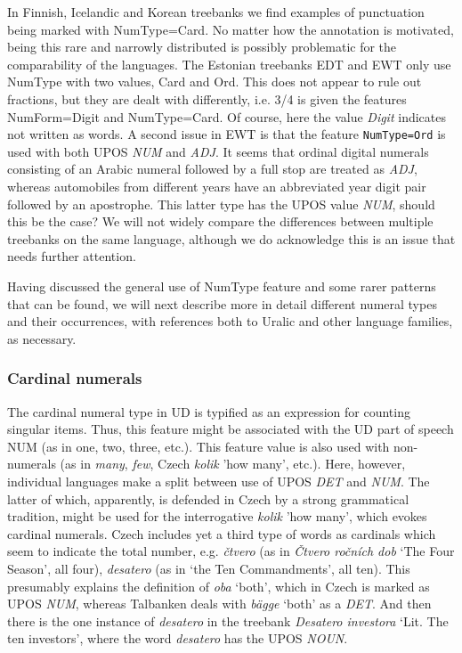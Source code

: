 \documentclass[free]{flammie}
\begin{document}
In Finnish, Icelandic and Korean treebanks we find examples of punctuation being
marked with NumType=Card. No matter how the annotation is motivated, being this
rare and narrowly distributed is possibly problematic for the comparability of
the languages.  The Estonian treebanks EDT and EWT only use NumType with two
values, Card and Ord.  This does not appear to rule out fractions, but they are
dealt with differently, i.e. 3/4 is given the features NumForm=Digit and
NumType=Card. Of course, here the value \textit{Digit} indicates not written as
words.  A second issue in EWT is that the feature \texttt{NumType=Ord} is used
with both UPOS \textit{NUM} and \textit{ADJ}. It seems that ordinal digital
numerals consisting of an Arabic numeral followed by a full stop are treated as
\textit{ADJ}, whereas automobiles from different years have an abbreviated year
digit pair followed by an apostrophe. This latter type has the UPOS value
\textit{NUM}, should this be the case?  We will not widely compare the
differences between multiple treebanks on the same language, although we do
acknowledge this is an issue that needs further attention.


Having discussed the general use of NumType feature and some rarer patterns that
can be found, we will next describe more in detail different numeral types and
their occurrences, with references both to Uralic and other language families,
as necessary.

\subsubsection{Cardinal numerals}

The cardinal numeral type in UD is typified as an expression for counting
singular items. Thus, this feature might be associated with the UD part of
speech NUM (as in one, two, three, etc.). This feature value is also used with
non-numerals (as in \textit{many}, \textit{few}, Czech \textit{kolik} 'how
many', etc.). Here, however, individual languages make a split between use of
UPOS \textit{DET} and \textit{NUM}. The latter of which, apparently, is defended
in Czech by a strong grammatical tradition, might be used for the interrogative
\textit{kolik} 'how many', which evokes cardinal numerals.  Czech includes yet a
third type of words as cardinals which seem to indicate the total number, e.g.
\textit{čtvero} (as in \textit{Čtvero ročních dob} `The Four Season', all four),
\textit{desatero} (as in `the Ten Commandments', all ten). This presumably
explains the definition of \textit{oba} `both', which in Czech is marked as UPOS
\textit{NUM}, whereas Talbanken deals with \textit{bägge} `both' as a
\textit{DET}. And then there is the one instance of \textit{desatero} in the
treebank \textit{Desatero investora} `Lit. The ten investors', where the word
\textit{desatero} has the UPOS \textit{NOUN}.
\end{document}
